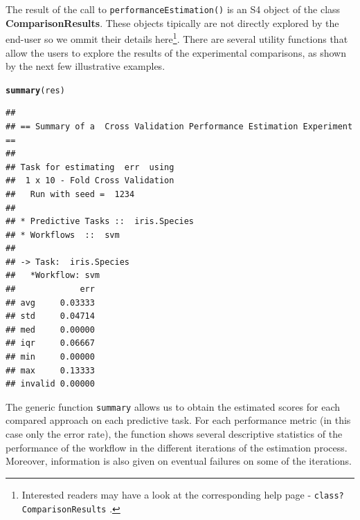 \documentclass[10pt,a4paper]{article}\usepackage[]{graphicx}\usepackage[]{color}
\makeatletter
\newcommand{\hlstd}[1]{\textcolor[rgb]{0.345,0.345,0.345}{#1}}%
\newcommand{\hlkwd}[1]{\textcolor[rgb]{0.737,0.353,0.396}{\textbf{#1}}}%
\newenvironment{kframe}{%
 \def\at@end@of@kframe{}%
 \ifinner\ifhmode%
  \def\at@end@of@kframe{\end{minipage}}%
  \begin{minipage}{\columnwidth}%
 \fi\fi%
 \def\FrameCommand##1{\hskip\@totalleftmargin \hskip-\fboxsep
 \colorbox{shadecolor}{##1}\hskip-\fboxsep
     \hskip-\linewidth \hskip-\@totalleftmargin \hskip\columnwidth}%
 \MakeFramed {\advance\hsize-\width
   \@totalleftmargin\z@ \linewidth\hsize
   \@setminipage}}%
 {\par\unskip\endMakeFramed%
 \at@end@of@kframe}
\newenvironment{knitrout}{}{} %
\makeatother
\begin{document}

The result of the call to \texttt{performanceEstimation()} is an S4
object of the class \textbf{ComparisonResults}. These objects tipically are not
 directly explored by the end-user so we ommit their
details here\footnote{Interested readers may have a look at the corresponding
  help page - \texttt{class?ComparisonResults} .}. There are several utility
functions that allow the users to explore the results of the
experimental comparisons, as shown by the next few illustrative examples.




\begin{knitrout}\footnotesize
{}\color{fgcolor}\begin{kframe}
\begin{alltt}
\hlkwd{summary}\hlstd{(res)}
\end{alltt}
\begin{verbatim}
## 
## == Summary of a  Cross Validation Performance Estimation Experiment ==
## 
## Task for estimating  err  using
##  1 x 10 - Fold Cross Validation
## 	 Run with seed =  1234 
## 
## * Predictive Tasks ::  iris.Species
## * Workflows  ::  svm 
## 
## -> Task:  iris.Species
##   *Workflow: svm 
##             err
## avg     0.03333
## std     0.04714
## med     0.00000
## iqr     0.06667
## min     0.00000
## max     0.13333
## invalid 0.00000
\end{verbatim}
\end{kframe}
\end{knitrout}

The generic function \texttt{summary} allows us to obtain the
estimated scores for each compared approach on each predictive
task. For each performance metric (in this case only the error rate),
the function shows several descriptive statistics of the performance of the workflow in the different iterations of the estimation process. Moreover,
information is also given on eventual failures on some of the
iterations.
\end{document}
